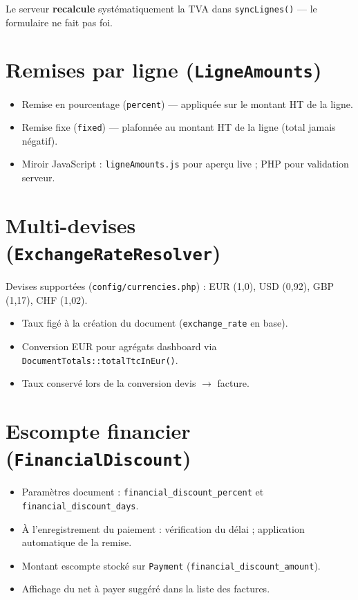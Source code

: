 \documentclass[11pt,a4paper]{report}
\newcommand{\svc}[1]{\texttt{\small #1}}
\newcommand{\model}[1]{\texttt{\small #1}}
\begin{document}
Le serveur \textbf{recalcule} systématiquement la TVA dans \texttt{syncLignes()} — le formulaire ne fait pas foi.

\section{Remises par ligne (\svc{LigneAmounts})}

\begin{itemize}[leftmargin=*]
    \item Remise en pourcentage (\texttt{percent}) — appliquée sur le montant HT de la ligne.
    \item Remise fixe (\texttt{fixed}) — plafonnée au montant HT de la ligne (total jamais négatif).
    \item Miroir JavaScript : \texttt{ligneAmounts.js} pour aperçu live ; PHP pour validation serveur.
\end{itemize}

\section{Multi-devises (\svc{ExchangeRateResolver})}

Devises supportées (\texttt{config/currencies.php}) : EUR (1{,}0), USD (0{,}92), GBP (1{,}17), CHF (1{,}02).

\begin{itemize}[leftmargin=*]
    \item Taux figé à la création du document (\texttt{exchange\_rate} en base).
    \item Conversion EUR pour agrégats dashboard via \svc{DocumentTotals::totalTtcInEur()}.
    \item Taux conservé lors de la conversion devis $\rightarrow$ facture.
\end{itemize}

\section{Escompte financier (\svc{FinancialDiscount})}

\begin{itemize}[leftmargin=*]
    \item Paramètres document : \texttt{financial\_discount\_percent} et \texttt{financial\_discount\_days}.
    \item À l'enregistrement du paiement : vérification du délai ; application automatique de la remise.
    \item Montant escompte stocké sur \model{Payment} (\texttt{financial\_discount\_amount}).
    \item Affichage du net à payer suggéré dans la liste des factures.
\end{itemize}
\end{document}
